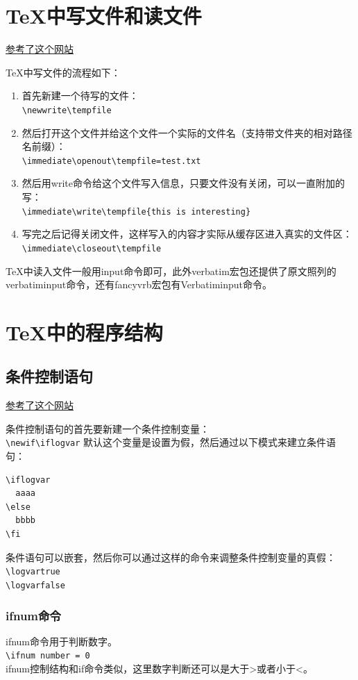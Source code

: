 \documentclass[12pt,oneside]{book}
\begin{document}
\begin{common-format}
\section{TeX中写文件和读文件}
\href{http://stackoverflow.com/questions/2115379/write-and-read-from-a-latex-temporary-file}{参考了这个网站}

TeX中写文件的流程如下： 
\begin{enumerate}
\item 首先新建一个待写的文件：\\
\verb+\newwrite\tempfile+
\item 然后打开这个文件并给这个文件一个实际的文件名（支持带文件夹的相对路径名前缀）：\\
\verb+\immediate\openout\tempfile=test.txt+
\item 然后用write命令给这个文件写入信息，只要文件没有关闭，可以一直附加的写：\\
\verb+\immediate\write\tempfile{this is interesting}+
\item 写完之后记得关闭文件，这样写入的内容才实际从缓存区进入真实的文件区：\\
\verb+\immediate\closeout\tempfile+
\end{enumerate}

TeX中读入文件一般用input命令即可，此外verbatim宏包还提供了原文照列的verbatiminput命令，还有fancyvrb宏包有Verbatiminput命令。

\section{TeX中的程序结构}
\subsection{条件控制语句}
\label{sec:条件控制语句}
\href{http://handyfloss.wordpress.com/2007/08/29/latex-programming-how-to-implement-conditionals/}{参考了这个网站}

条件控制语句的首先要新建一个条件控制变量：\\
\verb+\newif\iflogvar+
默认这个变量是设置为假，然后通过以下模式来建立条件语句：
\begin{Verbatim}
\iflogvar
  aaaa
\else
  bbbb
\fi
\end{Verbatim}
条件语句可以嵌套，然后你可以通过这样的命令来调整条件控制变量的真假：\\
\verb+\logvartrue+\\
\verb+\logvarfalse+

\subsubsection{ifnum命令}
ifnum命令用于判断数字。\\
\verb+\ifnum number = 0+\\
ifnum控制结构和if命令类似，这里数字判断还可以是大于>或者小于<。


\end{common-format}
\end{document}
